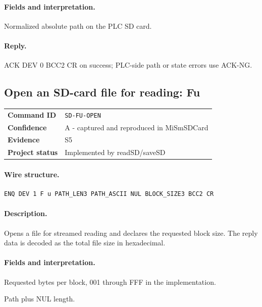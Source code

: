 \documentclass[10pt,letterpaper]{article}
\begin{document}
\paragraph{Fields and interpretation.}
\begin{description}[style=nextline,leftmargin=3.2cm,labelwidth=3.0cm,font=\normalfont\bfseries]
\item[PATH\_ASCII] Normalized absolute path on the PLC SD card.
\end{description}
\paragraph{Reply.} ACK DEV 0 BCC2 CR on success; PLC-side path or state errors use ACK-NG.

\subsection{Open an SD-card file for reading: Fu}
\begin{tabularx}{\textwidth}{@{}>{\bfseries}p{2.8cm}X@{}}
Command ID & \texttt{SD-FU-OPEN} \\
Confidence & A - captured and reproduced in MiSmSDCard \\
Evidence & S5 \\
Project status & Implemented by readSD/saveSD \\
\end{tabularx}
\vspace{0.35em}
\paragraph{Wire structure.}
\begin{Verbatim}[breaklines=true,breakanywhere=true,fontsize=\small]
ENQ DEV 1 F u PATH_LEN3 PATH_ASCII NUL BLOCK_SIZE3 BCC2 CR
\end{Verbatim}
\paragraph{Description.} Opens a file for streamed reading and declares the requested block size. The reply data is decoded as the total file size in hexadecimal.
\paragraph{Fields and interpretation.}
\begin{description}[style=nextline,leftmargin=3.2cm,labelwidth=3.0cm,font=\normalfont\bfseries]
\item[BLOCK\_SIZE3] Requested bytes per block, 001 through FFF in the implementation.
\item[PATH\_LEN3] Path plus NUL length.
\end{description}
\end{document}
